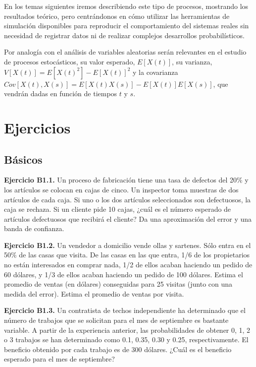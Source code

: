 \documentclass[
]{book}
\theoremstyle{definition}
\theoremstyle{definition}
\theoremstyle{definition}
\theoremstyle{definition}
\theoremstyle{remark}
\begin{document}
En los temas siguientes iremos describiendo este tipo de procesos, mostrando los resultados teórico, pero centrándonos en cómo utilizar las herramientas de simulación disponibles para reproducir el comportamiento del sistemas reales sin necesidad de registrar datos ni de realizar complejos desarrollos probabilísticos.

Por analogía con el análisis de variables aleatorias serán relevantes en el estudio de procesos estocásticos, su valor esperado, \(E[X(t)]\), su varianza, \(V[X(t)] = E[X(t)^2] - E[X(t)]^2\) y la covarianza \(Cov[X(t), X(s)] = E[X(t)X(s)] - E[X(t)]E[X(s)]\), que vendrán dadas en función de tiempos \(t\) y \(s\).

\hypertarget{ejer-u1}{%
\section{Ejercicios}\label{ejer-u1}}

\hypertarget{buxe1sicos}{%
\subsection{Básicos}\label{buxe1sicos}}

\textbf{Ejercicio B1.1.} Un proceso de fabricación tiene una tasa de defectos del 20\% y los artículos se colocan en cajas de cinco. Un inspector toma muestras de dos artículos de cada caja. Si uno o los dos artículos seleccionados son defectuosos, la caja se rechaza. Si un cliente pide 10 cajas, ¿cuál es el número esperado de artículos defectuosos que recibirá el cliente? Da una aproximación del error y una banda de confianza.

\textbf{Ejercicio B1.2.} Un vendedor a domicilio vende ollas y sartenes. Sólo entra en el 50\% de las casas que visita. De las casas en las que entra, 1/6 de los propietarios no están interesados en comprar nada, 1/2 de ellos acaban haciendo un pedido de 60 dólares, y 1/3 de ellos acaban haciendo un pedido de 100 dólares. Estima el promedio de ventas (en dólares) conseguidas para 25 visitas (junto con una medida del error). Estima el promedio de ventas por visita.

\textbf{Ejercicio B1.3.} Un contratista de techos independiente ha determinado que el número de trabajos que se solicitan para el mes de septiembre es bastante variable. A partir de la experiencia anterior, las probabilidades de obtener 0, 1, 2 o 3 trabajos se han determinado como 0.1, 0.35, 0.30 y 0.25, respectivamente. El beneficio obtenido por cada trabajo es de 300 dólares. ¿Cuál es el beneficio esperado para el mes de septiembre?
\end{document}
